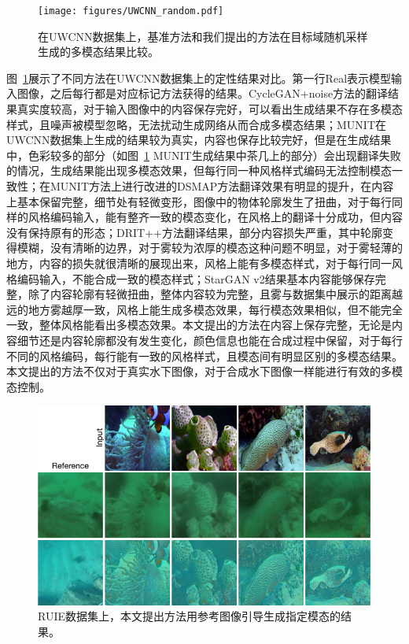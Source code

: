 \begin{figure}
    \centering
	\texttt{[image: figures/UWCNN\_random.pdf]}
	\caption{在UWCNN数据集上，基准方法和我们提出的方法在目标域随机采样生成的多模态结果比较。}
	\label{fig:uwcnn_random}
\end{figure}

图~\ref{fig:uwcnn_random}展示了不同方法在UWCNN数据集上的定性结果对比。第一行Real表示模型输入图像，之后每行都是对应标记方法获得的结果。CycleGAN+noise方法的翻译结果真实度较高，对于输入图像中的内容保存完好，可以看出生成结果不存在多模态样式，且噪声被模型忽略，无法扰动生成网络从而合成多模态结果；MUNIT在UWCNN数据集上生成的结果较为真实，内容也保存比较完好，但是在生成结果中，色彩较多的部分（如图~\ref{fig:uwcnn_random} MUNIT生成结果中茶几上的部分）会出现翻译失败的情况，生成结果能出现多模态效果，但每行同一种风格样式编码无法控制模态一致性；在MUNIT方法上进行改进的DSMAP方法翻译效果有明显的提升，在内容上基本保留完整，细节处有轻微变形，图像中的物体轮廓发生了扭曲，对于每行同样的风格编码输入，能有整齐一致的模态变化，在风格上的翻译十分成功，但内容没有保持原有的形态；DRIT++方法翻译结果，部分内容损失严重，其中轮廓变得模糊，没有清晰的边界，对于雾较为浓厚的模态这种问题不明显，对于雾轻薄的地方，内容的损失就很清晰的展现出来，风格上能有多模态样式，对于每行同一风格编码输入，不能合成一致的模态样式；StarGAN v2结果基本内容能够保存完整，除了内容轮廓有轻微扭曲，整体内容较为完整，且雾与数据集中展示的距离越远的地方雾越厚一致，风格上能生成多模态效果，每行模态效果相似，但不能完全一致，整体风格能看出多模态效果。本文提出的方法在内容上保存完整，无论是内容细节还是内容轮廓都没有发生变化，颜色信息也能在合成过程中保留，对于每行不同的风格编码，每行能有一致的风格样式，且模态间有明显区别的多模态结果。本文提出的方法不仅对于真实水下图像，对于合成水下图像一样能进行有效的多模态控制。


\begin{figure}[ht]
    \centering
	\includegraphics[width=\textwidth]{figures/RUIE_guidance.pdf}
	\caption{RUIE数据集上，本文提出方法用参考图像引导生成指定模态的结果。}
	\label{fig:ruie_guide}
\end{figure}

